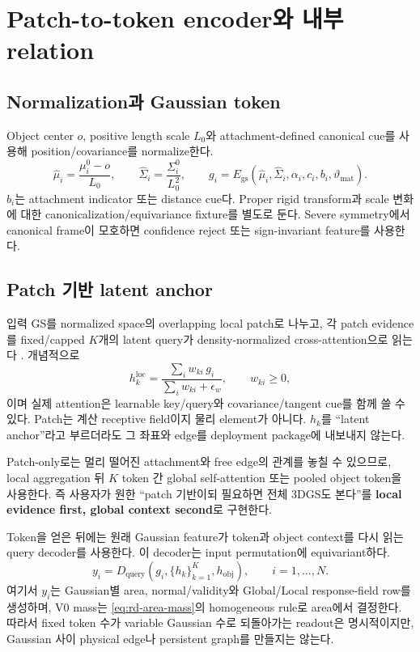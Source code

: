 \documentclass[11pt]{article}
\begin{document}
\section{Patch-to-token encoder와 내부 relation}

\subsection{Normalization과 Gaussian token}

Object center \(o\), positive length scale \(L_0\)와 attachment-defined canonical cue를 사용해
position/covariance를 normalize한다.
\begin{equation}
  \widehat\mu_i=\frac{\mu_i^0-o}{L_0},\qquad
  \widehat\Sigma_i=\frac{\Sigma_i^0}{L_0^2},\qquad
  g_i=E_{\mathrm{gs}}(\widehat\mu_i,\widehat\Sigma_i,\alpha_i,c_i,b_i,\vartheta_{\mathrm{mat}}).
  \label{eq:rd-gaussian-token}
\end{equation}
\(b_i\)는 attachment indicator 또는 distance cue다. Proper rigid transform과 scale 변화에 대한
canonicalization/equivariance fixture를 별도로 둔다. Severe symmetry에서 canonical frame이 모호하면
confidence reject 또는 sign-invariant feature를 사용한다.

\subsection{Patch 기반 latent anchor}

입력 GS를 normalized space의 overlapping local patch로 나누고, 각 patch evidence를 fixed/capped
\(K\)개의 latent query가 density-normalized cross-attention으로 읽는다 \cite{jaegle2021perceiverio}.
개념적으로
\begin{equation}
  h_k^{\mathrm{loc}}
  =\frac{\sum_i w_{ki}\,g_i}{\sum_i w_{ki}+\epsilon_w},\qquad
  w_{ki}\ge0,
  \label{eq:rd-latent-anchor}
\end{equation}
이며 실제 attention은 learnable key/query와 covariance/tangent cue를 함께 쓸 수 있다.
Patch는 계산 receptive field이지 물리 element가 아니다. \(h_k\)를 ``latent anchor''라고 부르더라도
그 좌표와 edge를 deployment package에 내보내지 않는다.

Patch-only로는 멀리 떨어진 attachment와 free edge의 관계를 놓칠 수 있으므로,
local aggregation 뒤 \(K\) token 간 global self-attention 또는 pooled object token을 사용한다.
즉 사용자가 원한 ``patch 기반이되 필요하면 전체 3DGS도 본다''를
\textbf{local evidence first, global context second}로 구현한다.

Token을 얻은 뒤에는 원래 Gaussian feature가 token과 object context를 다시 읽는 query decoder를 사용한다.
이 decoder는 input permutation에 equivariant하다.
\[
  y_i=D_{\mathrm{query}}\!\left(g_i,\{h_k\}_{k=1}^{K},h_{\mathrm{obj}}\right),
  \qquad i=1,\ldots,N .
\]
여기서 \(y_i\)는 Gaussian별 area, normal/validity와 Global/Local response-field row를 생성하며,
V0 mass는 \eqref{eq:rd-area-mass}의 homogeneous rule로 area에서 결정한다.
따라서 fixed token 수가 variable Gaussian 수로 되돌아가는 readout은 명시적이지만, Gaussian 사이 physical
edge나 persistent graph를 만들지는 않는다.
\end{document}
